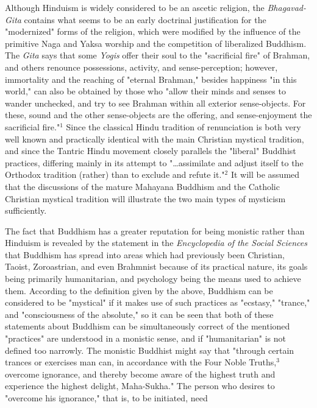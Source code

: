 Although Hinduism is widely considered to be an ascetic
religion, the \textit{Bhagavad-Gita} contains what seems to be an
early doctrinal justification for the "modernized" forms of
the religion, which were modified by the influence of the
primitive Naga and Yaksa worship and the competition of
liberalized Buddhism. The \textit{Gita} says that some \textit{Yogis} offer
their soul to the "sacrificial fire" of Brahman, and others
renounce possessions, activity, and sense-perception; however,
immortality and the reaching of "eternal Brahman,"
besides happiness "in this world," can also be obtained by
those who "allow their minds and senses to wander unchecked,
and try to see Brahman within all exterior sense-objects.
For these, sound and the other sense-objects are the offering,
and sense-enjoyment the sacrificial fire."$^{1}$ Since the
classical Hindu tradition of renunciation is both very well
known and practically identical with the main Christian
mystical tradition, and since the Tantric Hindu movement
closely parallels the "liberal" Buddhist practices, differing
mainly in its attempt to "\dots assimilate and adjust itself to
the Orthodox tradition (rather) than to exclude and refute it."$^{2}$
It will be assumed that the discussions of the mature
Mahayana Buddhism and the Catholic Christian mystical tradition
will illustrate the two main types of mysticism sufficiently.\par
\vspace*{0.5\baselineskip}
The fact that Buddhism has a greater reputation for being
monistic rather than Hinduism is revealed by the statement in the
\textit{Encyclopedia of the Social Sciences} that Buddhism has spread
into areas which had previously been Christian, Taoist,
Zoroastrian, and even Brahmnist because of its practical
nature, its goals being primarily humanitarian, and psychology
being the means used to achieve them. According to the definition
given by the above, Buddhism can be considered to be
"mystical" if it makes use of such practices as "ecstasy,"
"trance," and "consciousness of the absolute," so it can be
seen that both of these statements about Buddhism can be
simultaneously correct of the mentioned "practices" are
understood in a monistic sense, and if "humanitarian" is
not defined too narrowly. The monistic Buddhist might say
that "through certain trances or exercises man can, in
accordance with the Four Noble Truths,$^{3}$ overcome ignorance,
and thereby become aware of the highest truth and experience
the highest delight, Maha-Sukha." The person who desires to
"overcome his ignorance," that is, to be initiated, need
